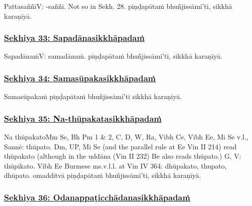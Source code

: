 Pattasaññī\makeatletter\hyperlink{endnote-appendix}\makeatother  V: -saññi. Not so in Sekh. 28. piṇḍapātaṁ bhuñjissāmī'ti, sikkhā karaṇīyā.



\subsubsection*{\hyperref[training33]{Sekhiya 33: Sapadānasikkhāpadaṁ}}
\label{sekh33}

Sapadānaṁ\makeatletter\hyperlink{endnote-appendix}\makeatother V: samadānaṁ. piṇḍapātaṁ bhuñjissāmī'ti, sikkhā karaṇīyā.



\subsubsection*{\hyperref[training34]{Sekhiya 34: Samasūpakasikkhāpadaṁ}}
\label{sekh34}

Samasūpakaṁ piṇḍapātaṁ bhuñjissāmī'ti sikkhā karaṇīyā.



\subsubsection*{\hyperref[training35]{Sekhiya 35: Na-thūpakatasikkhāpadaṁ}}
\label{sekh35}

Na thūpakato\makeatletter\hyperlink{endnote-appendix}\makeatother Mm Se, Bh Pm 1 & 2, C, D, W, Ra, Vibh Ce, Vibh Ee, Mi Se v.l., Sannē: thūpato. Dm, UP, Mi Se (and the parallel rule at Ee
Vin II 214) read thūpakato (although in the uddāna (Vin II 232) Be also reads thūpato.) G, V: thūpikato. Vibh Ee Burmese ms.v.l.l. at Vin IV 364: dhūpakato, thupato, dhūpato. omadditvā piṇḍapātaṁ bhuñjissāmī'ti, sikkhā karaṇīyā.



\subsubsection*{\hyperref[training36]{Sekhiya 36: Odanappaṭicchādanasikkhāpadaṁ}}
\label{sekh36}

